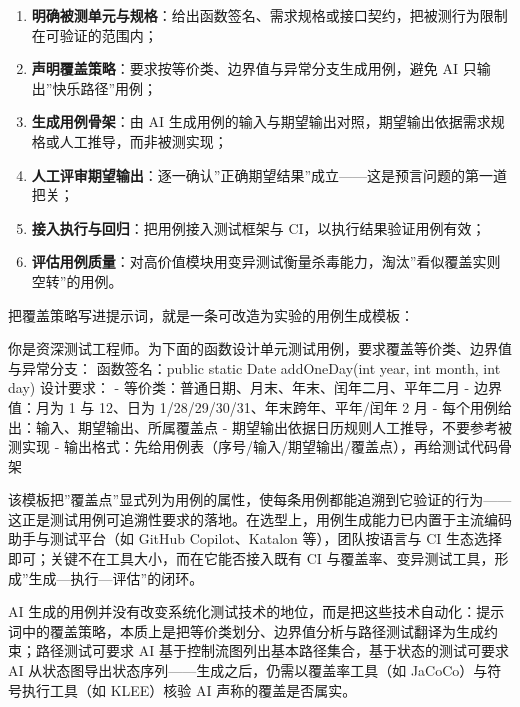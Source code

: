\documentclass[
]{ctexbook}
\providecommand{\tightlist}{\setlength{\itemsep}{0pt}\setlength{\parskip}{0pt} }
\newenvironment{Shaded}{
  \ttfamily\small
}{}
\newcommand{\NormalTok}[1]{#1}
\begin{document}
\begin{enumerate}
\def\labelenumi{\arabic{enumi}.}
\tightlist
\item
  \textbf{明确被测单元与规格}：给出函数签名、需求规格或接口契约，把被测行为限制在可验证的范围内；
\item
  \textbf{声明覆盖策略}：要求按等价类、边界值与异常分支生成用例，避免 AI
  只输出''快乐路径''用例；
\item
  \textbf{生成用例骨架}：由 AI
  生成用例的输入与期望输出对照，期望输出依据需求规格或人工推导，而非被测实现；
\item
  \textbf{人工评审期望输出}：逐一确认''正确期望结果''成立------这是预言问题的第一道把关；
\item
  \textbf{接入执行与回归}：把用例接入测试框架与
  CI，以执行结果验证用例有效；
\item
  \textbf{评估用例质量}：对高价值模块用变异测试衡量杀毒能力，淘汰''看似覆盖实则空转''的用例。
\end{enumerate}

把覆盖策略写进提示词，就是一条可改造为实验的用例生成模板：

\begin{Shaded}
\begin{Highlighting}[]
\NormalTok{你是资深测试工程师。为下面的函数设计单元测试用例，要求覆盖等价类、边界值与异常分支：}
\NormalTok{函数签名：public static Date addOneDay(int year, int month, int day)}
\NormalTok{设计要求：}
\NormalTok{{-} 等价类：普通日期、月末、年末、闰年二月、平年二月}
\NormalTok{{-} 边界值：月为 1 与 12、日为 1/28/29/30/31、年末跨年、平年/闰年 2 月}
\NormalTok{{-} 每个用例给出：输入、期望输出、所属覆盖点}
\NormalTok{{-} 期望输出依据日历规则人工推导，不要参考被测实现}
\NormalTok{{-} 输出格式：先给用例表（序号/输入/期望输出/覆盖点），再给测试代码骨架}
\end{Highlighting}
\end{Shaded}

该模板把''覆盖点''显式列为用例的属性，使每条用例都能追溯到它验证的行为------这正是测试用例可追溯性要求的落地。在选型上，用例生成能力已内置于主流编码助手与测试平台（如
GitHub Copilot、Katalon 等），团队按语言与 CI
生态选择即可；关键不在工具大小，而在它能否接入既有 CI
与覆盖率、变异测试工具，形成''生成---执行---评估''的闭环。

AI
生成的用例并没有改变系统化测试技术的地位，而是把这些技术自动化：提示词中的覆盖策略，本质上是把等价类划分、边界值分析与路径测试翻译为生成约束；路径测试可要求
AI 基于控制流图列出基本路径集合，基于状态的测试可要求 AI
从状态图导出状态序列------生成之后，仍需以覆盖率工具（如
JaCoCo）与符号执行工具（如 KLEE）核验 AI 声称的覆盖是否属实。
\end{document}
